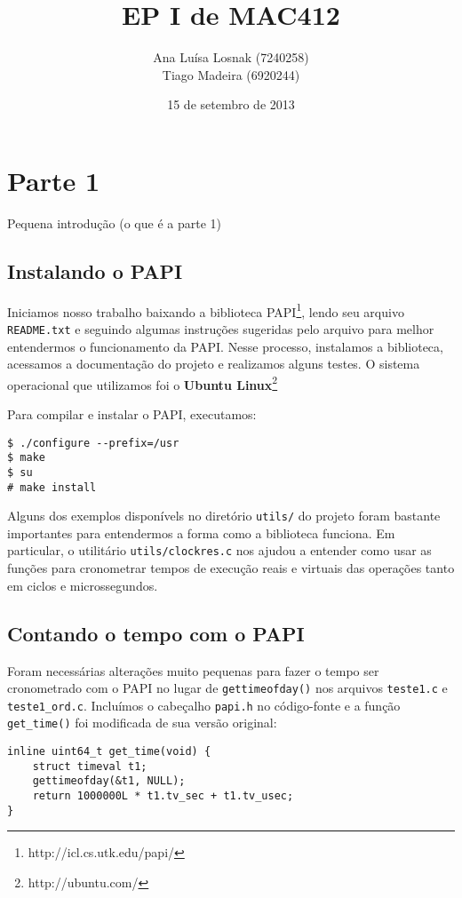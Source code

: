\documentclass[a4paper,oneside,12pt]{article}
\title{EP I de MAC412}
\author{Ana Luísa Losnak (7240258)\\
        Tiago Madeira (6920244)}
\date{15 de setembro de 2013}
\begin{document}
\maketitle
\tableofcontents
\newpage

\section{Parte 1}

Pequena introdução (o que é a parte 1) %

\subsection{Instalando o PAPI}

Iniciamos nosso trabalho baixando a biblioteca PAPI\footnote{http://icl.cs.utk.edu/papi/}, lendo seu arquivo {\tt README.txt} e seguindo algumas instruções sugeridas pelo arquivo para melhor entendermos o funcionamento da PAPI. Nesse processo, instalamos a biblioteca, acessamos a documentação do projeto e realizamos alguns testes. O sistema operacional que utilizamos foi o \textbf{Ubuntu Linux}\footnote{http://ubuntu.com/}

Para compilar e instalar o PAPI, executamos:

\begin{verbatim}
$ ./configure --prefix=/usr
$ make
$ su
# make install
\end{verbatim}

Alguns dos exemplos disponívels no diretório {\tt utils/} do projeto foram bastante importantes para entendermos a forma como a biblioteca funciona. Em particular, o utilitário {\tt utils/clockres.c} nos ajudou a entender como usar as funções para cronometrar tempos de execução reais e virtuais das operações tanto em ciclos e microssegundos.

\subsection{Contando o tempo com o PAPI}

Foram necessárias alterações muito pequenas para fazer o tempo ser cronometrado com o PAPI no lugar de {\tt gettimeofday()} nos arquivos {\tt teste1.c} e {\tt teste1\_ord.c}. Incluímos o cabeçalho {\tt papi.h} no código-fonte e a função {\tt get\_time()} foi modificada de sua versão original:

\begin{verbatim}
inline uint64_t get_time(void) {
    struct timeval t1;
    gettimeofday(&t1, NULL);
    return 1000000L * t1.tv_sec + t1.tv_usec;
}
\end{verbatim}
\end{document}
